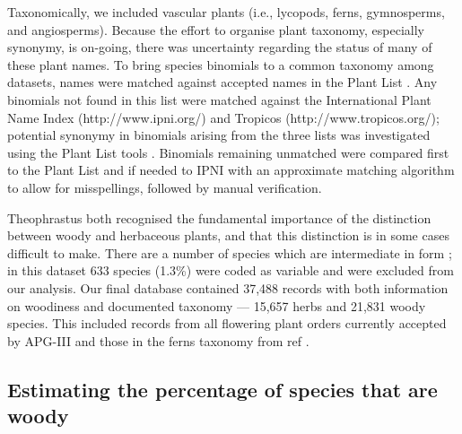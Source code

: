 \documentclass[a4paper,12pt]{article}
\begin{document}
Taxonomically, we included vascular plants (i.e., lycopods, ferns,
gymnosperms, and angiosperms).
%
Because the effort to organise plant taxonomy, especially synonymy, is
on-going, there was uncertainty regarding the status of many of these
plant names.  
%
To bring species binomials to a common taxonomy among datasets, names
were matched against accepted names in the Plant List
\citep{ThePlantList}.  Any binomials not found in this list were
matched against the International Plant Name Index
(http://www.ipni.org/) and Tropicos (http://www.tropicos.org/);
potential synonymy in binomials arising from the three lists was
investigated using the Plant List tools \citep{ThePlantList}.  
%
Binomials remaining unmatched were compared first to the Plant List
and if needed to IPNI with an approximate matching algorithm to allow
for misspellings, followed by manual verification.

Theophrastus both recognised the fundamental importance of the
distinction between woody and herbaceous plants, and that this
distinction is in some cases difficult to make.  There are a number of
species which are intermediate in form \citep{beaulieuHiddenRates}; in
this dataset 633 species (1.3\%) were coded as variable and were
excluded from our analysis.
%
Our final database contained 37,488 records with both information on
woodiness and documented taxonomy --- 15,657 herbs and 21,831 woody
species.  This included records from all flowering plant orders
currently accepted by APG-III \citep{APG3} and those in the ferns
taxonomy from ref \cite{apweb}.


\subsection{Estimating the percentage of species that are woody}
\end{document}
